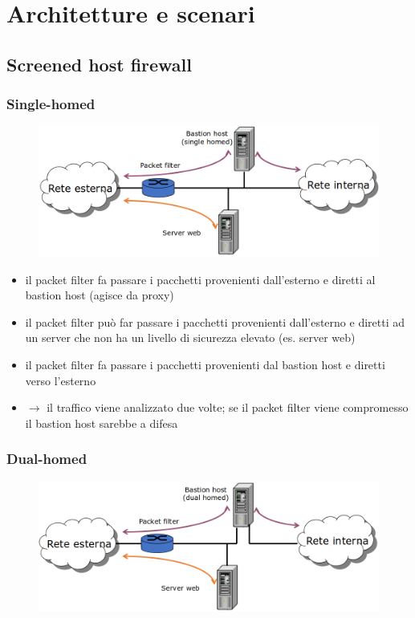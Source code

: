 \section{Architetture e scenari}
\subsection{Screened host firewall}

\subsubsection{Single-homed}

\begin{figure}[H]
    \centering
    \includegraphics[width=1\linewidth]{chapters/12/images/single-homed.png}
\end{figure}

\begin{itemize}
    \item il packet filter fa passare i pacchetti provenienti dall'esterno e 
    diretti al bastion host (agisce da proxy)
    \item il packet filter può far passare i pacchetti provenienti dall'esterno e 
    diretti ad un server che non ha un livello di sicurezza elevato (es. server web)
    \item il packet filter fa passare i pacchetti provenienti dal bastion host e diretti verso l'esterno
    
    \item $\rightarrow$ il traffico viene analizzato due volte; se il packet filter viene compromesso 
    il bastion host sarebbe a difesa
\end{itemize}

\subsubsection{Dual-homed}

\begin{figure}[H]
    \centering
    \includegraphics[width=1\linewidth]{chapters/12/images/dual-homed.png}
\end{figure}

